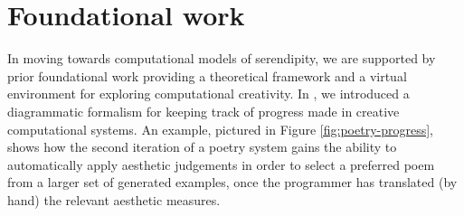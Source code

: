 \section{Foundational work} \label{sec:foundations}


In moving towards computational models of serendipity, we are
supported by prior foundational work providing a theoretical framework
and a virtual environment for exploring computational creativity.  In
, we introduced a diagrammatic
formalism for keeping track of progress made in creative computational
systems. An example, pictured in Figure \ref{fig:poetry-progress},
shows how the second iteration of a poetry system gains the ability to
automatically apply aesthetic judgements in order to select a
preferred poem from a larger set of generated examples, once the
programmer has translated (by hand) the relevant aesthetic measures.
